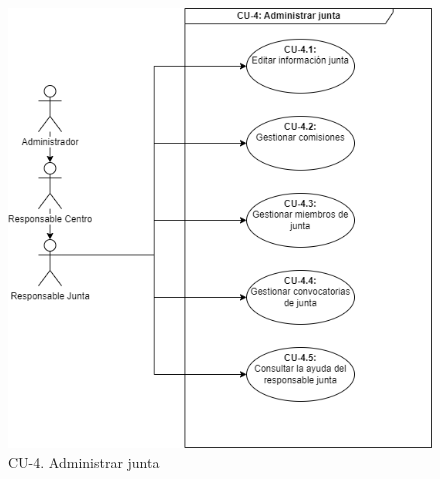 \begin{figure}[H]
        \centering
        \includegraphics[scale=0.55]{img/diagramas/Funcional/CU-4.png}
        \caption{CU-4. Administrar junta}
        \label{fig:Diagrama-Caso de uso 4. Administrar junta}
    \end{figure}
    
